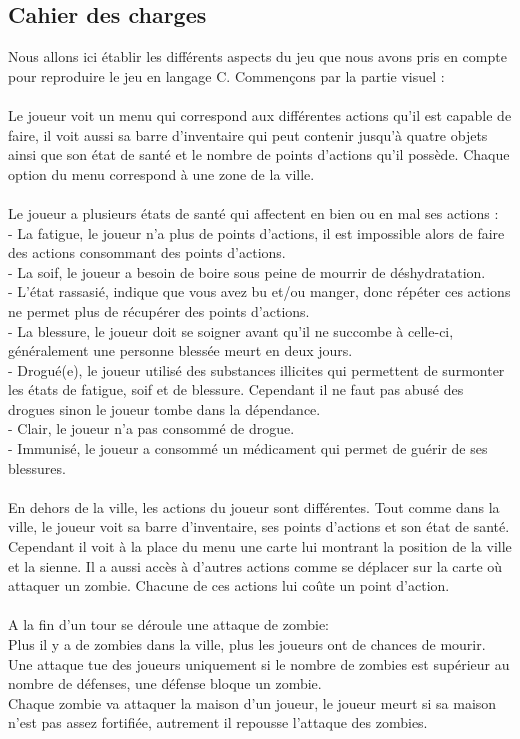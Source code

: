 \documentclass[a4paper,11pt]{article}
\begin{document}
\newpage

\subsection{Cahier des charges}
Nous allons ici établir les différents aspects du jeu que nous avons pris en compte pour reproduire le jeu en langage C. Commençons par la partie visuel :
\\
\\
Le joueur voit un menu qui correspond aux différentes actions qu'il est capable de faire, il voit aussi sa barre d'inventaire qui peut contenir jusqu'à quatre objets ainsi que son état de santé et le nombre de points d'actions qu'il possède. Chaque option du menu correspond à une zone de la ville.
\\
\\
Le joueur a plusieurs états de santé qui affectent en bien ou en mal ses actions :
\\
- La fatigue, le joueur n'a plus de points d'actions, il est impossible alors de faire des actions consommant des points d'actions.
\\    
- La soif, le joueur a besoin de boire sous peine de mourrir de déshydratation.
\\    
- L'état rassasié, indique que vous avez bu et/ou manger, donc répéter ces actions ne permet plus de récupérer des points d'actions.
\\    
- La blessure, le joueur doit se soigner avant qu'il ne succombe à celle-ci, généralement une personne blessée meurt en deux jours.
\\    
- Drogué(e), le joueur utilisé des substances illicites qui permettent de surmonter les états de fatigue, soif et de blessure. Cependant il ne faut pas abusé des drogues sinon le joueur tombe dans la dépendance.
\\    
- Clair, le joueur n'a pas consommé de drogue.
\\    
- Immunisé, le joueur a consommé un médicament qui permet de guérir de ses blessures.
\\
\\
En dehors de la ville, les actions du joueur sont différentes. Tout comme dans la ville, le joueur voit sa barre d'inventaire, ses points d'actions et son état de santé. Cependant il voit à la place du menu une carte lui montrant la position de la ville et la sienne. Il a aussi accès à d'autres actions comme se déplacer sur la carte où attaquer un zombie. Chacune de ces actions lui coûte un point d'action.
\\
\\
A la fin d'un tour se déroule une attaque de zombie:
\\
Plus il y a de zombies dans la ville, plus les joueurs ont de chances de mourir.
\\
Une attaque tue des joueurs uniquement si le nombre de zombies est supérieur au nombre de défenses, une défense bloque un zombie.
\\
Chaque zombie va attaquer la maison d'un joueur, le joueur meurt si sa maison n'est pas assez fortifiée, autrement il repousse l'attaque des zombies.
\end{document}
